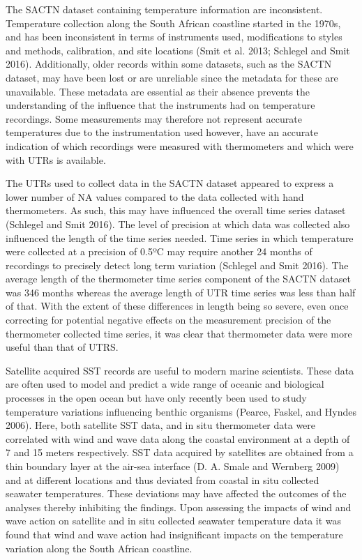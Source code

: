 \documentclass[12pt,A4paper,]{article}
\begin{document}
The SACTN dataset containing temperature information are inconsistent.
Temperature collection along the South African coastline started in the
1970s, and has been inconsistent in terms of instruments used,
modifications to styles and methods, calibration, and site locations
(Smit et al. 2013; Schlegel and Smit 2016). Additionally, older records
within some datasets, such as the SACTN dataset, may have been lost or
are unreliable since the metadata for these are unavailable. These
metadata are essential as their absence prevents the understanding of
the influence that the instruments had on temperature recordings. Some
measurements may therefore not represent accurate temperatures due to
the instrumentation used however, have an accurate indication of which
recordings were measured with thermometers and which were with UTRs is
available.

The UTRs used to collect data in the SACTN dataset appeared to express a
lower number of NA values compared to the data collected with hand
thermometers. As such, this may have influenced the overall time series
dataset (Schlegel and Smit 2016). The level of precision at which data
was collected also influenced the length of the time series needed. Time
series in which temperature were collected at a precision of 0.5ºC may
require another 24 months of recordings to precisely detect long term
variation (Schlegel and Smit 2016). The average length of the
thermometer time series component of the SACTN dataset was 346 months
whereas the average length of UTR time series was less than half of
that. With the extent of these differences in length being so severe,
even once correcting for potential negative effects on the measurement
precision of the thermometer collected time series, it was clear that
thermometer data were more useful than that of UTRS.

Satellite acquired SST records are useful to modern marine scientists.
These data are often used to model and predict a wide range of oceanic
and biological processes in the open ocean but have only recently been
used to study temperature variations influencing benthic organisms
(Pearce, Faskel, and Hyndes 2006). Here, both satellite SST data, and in
situ thermometer data were correlated with wind and wave data along the
coastal environment at a depth of 7 and 15 meters respectively. SST data
acquired by satellites are obtained from a thin boundary layer at the
air-sea interface (D. A. Smale and Wernberg 2009) and at different
locations and thus deviated from coastal in situ collected seawater
temperatures. These deviations may have affected the outcomes of the
analyses thereby inhibiting the findings. Upon assessing the impacts of
wind and wave action on satellite and in situ collected seawater
temperature data it was found that wind and wave action had
insignificant impacts on the temperature variation along the South
African coastline.
\end{document}
